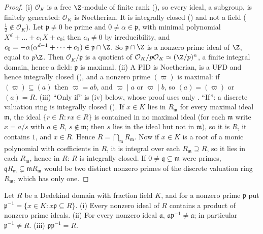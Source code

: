 \begin{proof}
(i) $\mathcal O_K$ is a free $\Z$-module of finite rank (), so every ideal, a subgroup, is finitely generated:
$\mathcal O_K$ is Noetherian. It is integrally closed () and not a field ($\frac12\notin\mathcal O_K$). Let $\mathfrak p\ne0$
be prime and $0\ne\alpha\in\mathfrak p$, with minimal polynomial $X^d+\dots+c_1X+c_0$; then $c_0\ne0$ by irreducibility, and
$c_0=-\alpha(\alpha^{d-1}+\dots+c_1)\in\mathfrak p\cap\Z$. So $\mathfrak p\cap\Z$ is a nonzero prime ideal of $\Z$, equal to $p\Z$. Then
$\mathcal O_K/\mathfrak p$ is a quotient of $\mathcal O_K/p\mathcal O_K\simeq(\Z/p)^n$, a finite integral domain, hence a field: $\mathfrak p$ is
maximal. (ii) A PID is Noetherian, is a UFD and hence integrally closed (), and a nonzero prime $(\varpi)$ is maximal: if
$(\varpi)\subseteq(a)$ then $\varpi=ab$, and $\varpi\mid a$ or $\varpi\mid b$, so $(a)=(\varpi)$ or $(a)=R$.
(iii) ``Only if'' is (iv) below, whose proof uses only . ``If'': a discrete valuation ring is
integrally closed (). If $x\in K$ lies in $R_{\mathfrak m}$ for every maximal ideal $\mathfrak m$, the ideal
$\{r\in R:rx\in R\}$ is contained in no maximal ideal (for each $\mathfrak m$ write $x=a/s$ with $a\in R$, $s\notin\mathfrak m$; then $s$ lies in the ideal but not in
$\mathfrak m$), so it is $R$, it contains $1$, and $x\in R$. Hence $R=\bigcap_{\mathfrak m}R_{\mathfrak m}$. Now if $x\in K$ is a root of a monic polynomial with
coefficients in $R$, it is integral over each $R_{\mathfrak m}\supseteq R$, so it lies in each $R_{\mathfrak m}$, hence in $R$: $R$ is integrally
closed. If $0\ne\mathfrak q\subsetneq\mathfrak m$ were primes, $\mathfrak qR_{\mathfrak m}\subsetneq\mathfrak mR_{\mathfrak m}$ would be two distinct
nonzero primes of the discrete valuation ring $R_{\mathfrak m}$, which has only one.
\end{proof}

\begin{lemma}\label{lem:ant:primeproducts}
Let $R$ be a Dedekind domain with fraction field $K$, and for a nonzero prime $\mathfrak p$ put $\mathfrak p^{-1}=\{x\in K:x\mathfrak p\subseteq R\}$.
(i) Every nonzero ideal of $R$ contains a product of nonzero prime ideals. (ii) For every nonzero ideal $\mathfrak a$, $\mathfrak a\mathfrak p^{-1}\ne\mathfrak a$;
in particular $\mathfrak p^{-1}\ne R$. (iii) $\mathfrak p\mathfrak p^{-1}=R$.
\end{lemma}

